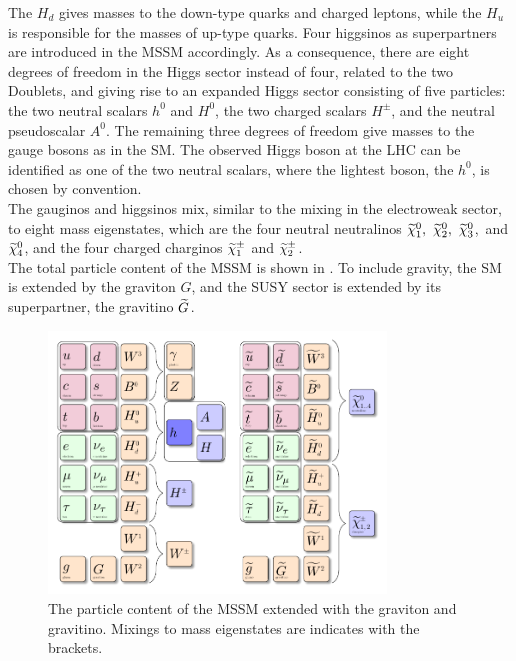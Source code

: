 The $H_d$ gives masses to the down-type quarks and charged leptons, while the $H_u$ is responsible for the masses of up-type quarks. Four higgsinos as superpartners are introduced in the MSSM accordingly. As a consequence, there are eight degrees of freedom in the Higgs sector instead of four, related to the two Doublets, and giving rise to an expanded Higgs sector consisting of five particles: the two neutral scalars $h^0$ and $H^0$, the two charged scalars $H^{\pm}$, and the neutral pseudoscalar $A^0$. The remaining three degrees of freedom give masses to the gauge bosons as in the SM. The observed Higgs boson at the LHC can be identified as one of the two neutral scalars, where the lightest boson, the $h^0$, is chosen by convention.\\
The gauginos and higgsinos mix, similar to the mixing in the electroweak sector, to eight mass eigenstates, which are the four neutral neutralinos $\widetilde{\chi}^{0}_{1},~\widetilde{\chi}^{0}_{2},~\widetilde{\chi}^{0}_{3}$,~and $\widetilde{\chi}^{0}_{4}$, and the four charged charginos $\widetilde{\chi}^\pm_{1}$ and $\widetilde{\chi}^{\pm}_{2}$.\\
The total particle content of the MSSM is shown in . To include gravity, the SM is extended by the graviton $G$, and the SUSY sector is extended by its superpartner, the gravitino $\widetilde{G}$.

\begin{figure}[tbp]
 \centering
 \includegraphics[width=0.8\textwidth]{figures/general/MSSM}
 \caption{The particle content of the MSSM extended with the graviton and gravitino. Mixings to mass eigenstates are indicates with the brackets.}
 \label{fig:mssm}
\end{figure}


